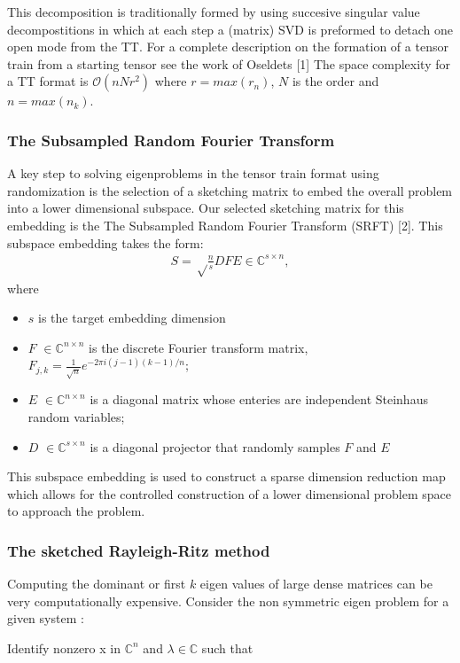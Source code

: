 \documentclass[%
 aip,12pt
 amsmath,amssymb,
 reprint,%
]{revtex4-1}
\begin{document}
This decomposition is traditionally formed by using succesive singular value decompostitions in which at each step a (matrix) SVD is preformed to detach one open mode from the TT. For a complete description on the formation of a tensor train from a starting tensor see the work of Oseldets [1]
The space complexity for a TT format is $\mathcal{O}(nNr^2)$ where $r=max(r_n)$, $N$ is the order and  $n=max(n_k)$.\\

\subsubsection{\label{sec:level3}The Subsampled Random Fourier Transform }
A key step to solving eigenproblems in the tensor train format using randomization is the selection of a sketching matrix to embed the overall problem into a lower dimensional subspace. Our selected sketching matrix for this embedding is the The Subsampled Random Fourier Transform (SRFT) [2]. This subspace embedding takes the form:
\begin{eqnarray}
  S=\sqrt\frac{n}{s} DFE \in \mathbb{C}^{s\times n},
  \label{eq:two}
\end{eqnarray}
where
\begin{itemize}
  \item $s$ is the target embedding dimension
  \item $F$ $\in \mathbb{C}^{n \times n}$ is the discrete Fourier transform matrix, $F_{j,k}=\frac{1}{\sqrt{n}}e^{-2\pi i(j-1)(k-1)/n}$;
  \item $E$ $\in \mathbb{C}^{n \times n}$ is a diagonal matrix whose enteries are independent Steinhaus random variables;
  \item $D$ $\in \mathbb{C}^{s \times n}$ is a diagonal projector that randomly samples $F$ and $E$

\end{itemize}
This subspace embedding is used to construct a sparse dimension reduction map which allows for the controlled construction of a lower dimensional problem space to approach the problem.
\subsubsection{\label{sec:level3}The sketched Rayleigh-Ritz method }
Computing the dominant or first $k$ eigen values of large dense matrices can be very computationally expensive.
Consider the non symmetric eigen problem for a given system :

Identify nonzero x in $\mathbb{C}^n$ and $\lambda \in \mathbb{C}$ such that\\
\end{document}
